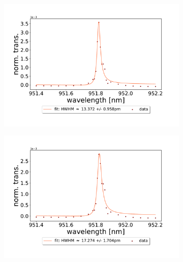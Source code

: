 \begin{figure}[h!]
    \centering
    \begin{subfigure}[b]{0.49\textwidth}
        \includegraphics[width=\textwidth]{figures/results/single fano fits/220um_M5_fit_1.pdf}
        \caption{}
        \label{fig:220um_M5_fit_1}
    \end{subfigure}
    \begin{subfigure}[b]{0.49\textwidth}
        \includegraphics[width=\textwidth]{figures/results/single fano fits/220um_M5_fit_2.pdf}
        \caption{}
        \label{fig:220um_M5_fit_2}
    \end{subfigure}
    \begin{subfigure}[b]{0.49\textwidth}

\end{subfigure}
\end{figure}
